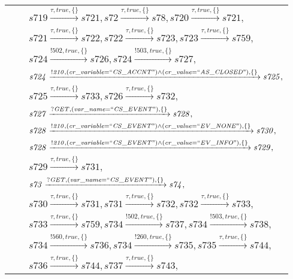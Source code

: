 \begin{tabular}{lcl}
& & $\mathit{s719}\xrightarrow{\mathit{\tau}, \mathit{true}, \{\}}\mathit{s721},\mathit{s72}\xrightarrow{\mathit{\tau}, \mathit{true}, \{\}}\mathit{s78},\mathit{s720}\xrightarrow{\mathit{\tau}, \mathit{true}, \{\}}\mathit{s721},$ \\
& & $\mathit{s721}\xrightarrow{\mathit{\tau}, \mathit{true}, \{\}}\mathit{s722},\mathit{s722}\xrightarrow{\mathit{\tau}, \mathit{true}, \{\}}\mathit{s723},\mathit{s723}\xrightarrow{\mathit{\tau}, \mathit{true}, \{\}}\mathit{s759},$ \\
& & $\mathit{s724}\xrightarrow{\mathit{!502}, \mathit{true}, \{\}}\mathit{s726},\mathit{s724}\xrightarrow{\mathit{!503}, \mathit{true}, \{\}}\mathit{s727},$ \\
& & $\mathit{s724}\xrightarrow{\mathit{!210}, \mathit{(cr\_variable = ``CS\_ACCNT") \land (cr\_value = ``AS\_CLOSED")}, \{\}}\mathit{s725},$ \\
& & $\mathit{s725}\xrightarrow{\mathit{\tau}, \mathit{true}, \{\}}\mathit{s733},\mathit{s726}\xrightarrow{\mathit{\tau}, \mathit{true}, \{\}}\mathit{s732},$ \\
& & $\mathit{s727}\xrightarrow{\mathit{?GET}, \mathit{(var\_name = ``CS\_EVENT")}, \{\}}\mathit{s728},$ \\
& & $\mathit{s728}\xrightarrow{\mathit{!210}, \mathit{(cr\_variable = ``CS\_EVENT") \land (cr\_value = ``EV\_NONE")}, \{\}}\mathit{s730},$ \\
& & $\mathit{s728}\xrightarrow{\mathit{!210}, \mathit{(cr\_variable = ``CS\_EVENT") \land (cr\_value = ``EV\_INFO")}, \{\}}\mathit{s729},$ \\
& & $\mathit{s729}\xrightarrow{\mathit{\tau}, \mathit{true}, \{\}}\mathit{s731},$ \\
& & $\mathit{s73}\xrightarrow{\mathit{?GET}, \mathit{(var\_name = ``CS\_EVENT")}, \{\}}\mathit{s74},$ \\
& & $\mathit{s730}\xrightarrow{\mathit{\tau}, \mathit{true}, \{\}}\mathit{s731},\mathit{s731}\xrightarrow{\mathit{\tau}, \mathit{true}, \{\}}\mathit{s732},\mathit{s732}\xrightarrow{\mathit{\tau}, \mathit{true}, \{\}}\mathit{s733},$ \\
& & $\mathit{s733}\xrightarrow{\mathit{\tau}, \mathit{true}, \{\}}\mathit{s759},\mathit{s734}\xrightarrow{\mathit{!502}, \mathit{true}, \{\}}\mathit{s737},\mathit{s734}\xrightarrow{\mathit{!503}, \mathit{true}, \{\}}\mathit{s738},$ \\
& & $\mathit{s734}\xrightarrow{\mathit{!560}, \mathit{true}, \{\}}\mathit{s736},\mathit{s734}\xrightarrow{\mathit{!260}, \mathit{true}, \{\}}\mathit{s735},\mathit{s735}\xrightarrow{\mathit{\tau}, \mathit{true}, \{\}}\mathit{s744},$ \\
& & $\mathit{s736}\xrightarrow{\mathit{\tau}, \mathit{true}, \{\}}\mathit{s744},\mathit{s737}\xrightarrow{\mathit{\tau}, \mathit{true}, \{\}}\mathit{s743},$ \\
\end{tabular}

